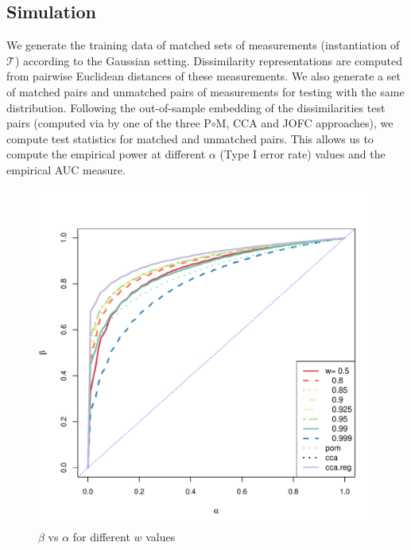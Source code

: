 \documentclass[11pt]{article} %
\begin{document}
\subsection{Simulation\label{subsec:sim}}

We generate the training data of matched sets of measurements (instantiation of $\mathcal{T}$) according to  the Gaussian setting. Dissimilarity representations are computed from pairwise Euclidean distances of these measurements. We also generate a set of matched pairs and unmatched pairs of measurements for testing with the same distribution. Following the out-of-sample embedding of the dissimilarities test pairs (computed via by one of the three P$\circ $M, CCA and JOFC approaches), we compute test statistics  for matched and unmatched pairs. This allows us to compute the empirical power  at different $\alpha$ (Type I error rate) values and the empirical AUC measure.


\begin{figure}[h]
     \centering
\includegraphics[scale=0.35]{MVN-FC-Tradeoff-OOS-c0.pdf}
\caption{$\beta$ vs $\alpha$  for different $w$ values }
\label{fig:MVN-c0-power-alpha}
\end{figure}
\end{document}
